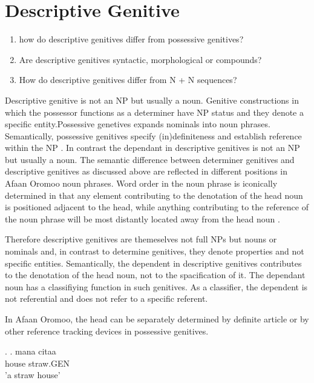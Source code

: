 \documentclass[11pt,a4paper]{article}
\begin{document}
	
	
	
	\section{Descriptive Genitive}
	
	
	
	\begin{enumerate}
		\item how do descriptive genitives differ from possessive genitives?
		\item Are descriptive genitives syntactic, morphological or compounds?
		\item How do descriptive genitives differ from N + N sequences?
	\end{enumerate}
	
	Descriptive genitive is not an NP but usually a noun. Genitive constructions in which the possessor functions as a determiner have NP status and they denote a specific entity.Possessive genetives expands nominals into noun phrases. Semantically, possessive genitives specify (in)definiteness and establish reference within the NP \cite[82]{rosenbach2006descriptive}. In contrast the dependant in descriptive genitives is not an NP but usually a noun. The semantic difference between determiner genitives and descriptive genitives as discussed above are reflected in different positions in Afaan Oromoo noun phrases. Word order in the noun phrase is iconically determined in that any element contributing to the denotation of the head noun is positioned adjacent to the head, while anything contributing to the reference of the noun phrase will be most distantly located away from the head noun \cite[81]{rosenbach2006descriptive}.
	
	Therefore descriptive genitives are themeselves not full NPs but nouns or nominals and, in contrast to 	determine genitives, they denote properties and not specific entities. 	Semantically, the dependent in descriptive genitives contributes to the denotation of the head noun, not to the spacification of it. The dependant noun has a classifiying function in such genitives. As a classifier, the dependent is not referential and does not refer to a specific referent. 
	
	In Afaan Oromoo, the head can be separately determined by definite article or by other reference tracking devices in possessive genitives.
	
	\ex.
	\ag.
	mana citaa \\
	house straw.GEN\\
	'a straw house'\\
	
\end{document}
